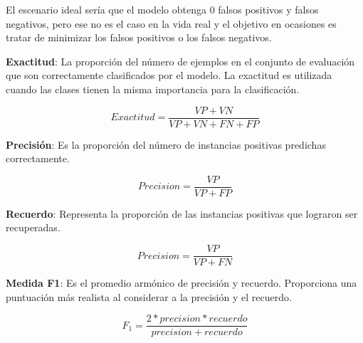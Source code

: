 El escenario ideal sería que el modelo obtenga $0$ falsos positivos y falsos negativos, pero ese no es el caso en la vida real y el objetivo en ocasiones es tratar de minimizar los falsos positivos o los falsos negativos.


\textbf{Exactitud}: La proporción del número de ejemplos en el conjunto de evaluación que son correctamente clasificados por el modelo. La exactitud es utilizada cuando las clases tienen la misma importancia para la clasificación.

\begin{equation} \label{eq:acc}
Exactitud = \frac{VP + VN}{VP + VN+ FN+FP}    
\end{equation}

\textbf{Precisión}: Es la proporción del número de instancias positivas predichas correctamente.

\begin{equation} \label{eq:precc}
Precision = \frac{VP}{VP+FP}    
\end{equation}

\textbf{Recuerdo}: Representa la proporción de las instancias positivas que lograron ser recuperadas.

\begin{equation} \label{eq:recc}
Precision = \frac {VP}{VP+FN}    
\end{equation}

\textbf{Medida F1}: Es el promedio armónico de precisión y recuerdo. Proporciona una puntuación más realista al considerar a la precisión y el recuerdo.

\begin{equation} \label{eq:f1}
F_1= \frac{2 * precision * recuerdo}{precision+recuerdo}   
\end{equation}